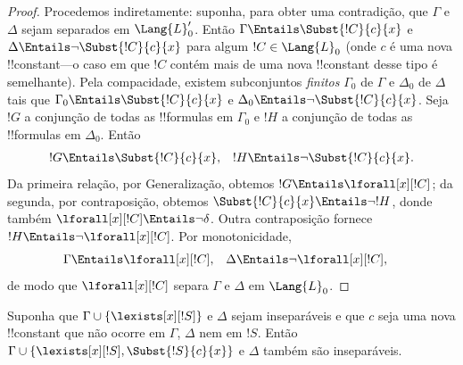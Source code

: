 \documentclass[../../../include/open-logic-section]{subfiles}
\begin{document}
\begin{proof}
Procedemos indiretamente: suponha, para obter uma contradição, que
$\Gamma$ e $\Delta$ sejam separados em $\Lang{L}'_0$. Então
$\Gamma \Entails \Subst{!C}{c}{x}$ e
$\Delta \Entails \lnot \Subst{!C}{c}{x}$ para algum
$!C \in \Lang{L}_0$ (onde $c$ é uma nova !!{constant}---o caso em que
$!C$ contém mais de uma nova !!{constant} desse tipo é semelhante).
Pela compacidade, existem subconjuntos \emph{finitos} $\Gamma_0$ de
$\Gamma$ e $\Delta_0$ de $\Delta$ tais que
$\Gamma_0 \Entails \Subst{!C}{c}{x}$ e
$\Delta_0 \Entails \lnot \Subst{!C}{c}{x}$. Seja $!G$ a conjunção de
todas as !!{formula}s em $\Gamma_0$ e $!H$ a conjunção de todas as
!!{formula}s em $\Delta_0$. Então
\begin{align*}
  !G & \Entails \Subst{!C}{c}{x}, & !H  \Entails \lnot \Subst{!C}{c}{x}.
\end{align*}
Da primeira relação, por Generalização, obtemos
$!G \Entails \lforall[x][!C]$; da segunda, por contraposição, obtemos
$\Subst{!C}{c}{x} \Entails \lnot !H$, donde também
$\lforall[x][!C] \Entails \lnot \delta$. Outra contraposição fornece
$!H \Entails \lnot \lforall[x][!C]$. Por monotonicidade,
\begin{align*}
  \Gamma &\Entails \lforall[x][!C], & 
  \Delta & \Entails \lnot \lforall[x][!C],
\end{align*}
de modo que $\lforall[x][!C]$ separa $\Gamma$ e $\Delta$ em
$\Lang{L}_0$.
\end{proof}

\begin{lem}
Suponha que $\Gamma \cup \{ \lexists[x][!S] \}$ e $\Delta$ sejam
inseparáveis e que $c$ seja uma nova !!{constant} que não ocorre em
$\Gamma$, $\Delta$ nem em $!S$. Então
$\Gamma \cup \{ \lexists[x][!S], \Subst{!S}{c}{x} \}$ e $\Delta$
também são inseparáveis.
\end{lem}
\end{document}
